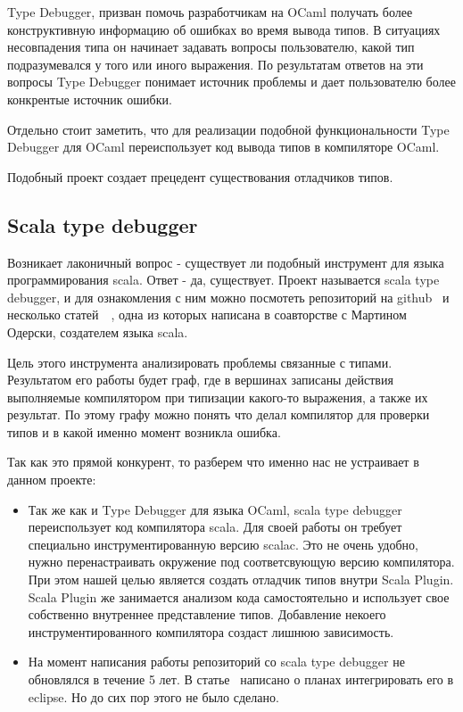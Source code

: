 Type Debugger, призван помочь разработчикам на OCaml получать более
конструктивную информацию об ошибках во время вывода типов.
В ситуациях несовпадения типа он начинает задавать
вопросы пользователю, какой тип подразумевался у того или иного выражения.
По результатам ответов на эти вопросы Type Debugger понимает источник проблемы
и дает пользователю более конкрентые источник ошибки.

Отдельно стоит заметить, что для реализации подобной функциональности
Type Debugger для OCaml переиспользует код вывода типов в компиляторе OCaml.

Подобный проект создает прецедент существования отладчиков типов.

\subsection{Scala type debugger}
\label{sec:typeDebugger}

Возникает лаконичный вопрос - существует ли подобный инструмент для языка
программирования scala.
Ответ - да, существует.
Проект называется scala type debugger, и для ознакомления с ним можно посмотеть
репозиторий на github~\cite{type_debugger_github} и несколько
статей~\cite{type_debugger1}~\cite{type_debugger2}, одна из которых
написана в соавторстве с Мартином Одерски, создателем языка scala.

Цель этого инструмента анализировать проблемы связанные с типами.
Результатом его работы будет граф, где в вершинах записаны действия выполняемые
компилятором при типизации какого-то выражения, а также их результат.
По этому графу можно понять что делал компилятор для проверки типов и
в какой именно момент возникла ошибка.

Так как это прямой конкурент, то разберем что именно нас не устраивает в данном
проекте:
\begin{itemize}
  \item Так же как и Type Debugger для языка OCaml, scala type debugger
  переиспользует код компилятора scala.
  Для своей работы он требует специально инструментированную версию scalac.
  Это не очень удобно, нужно перенастраивать окружение под соответсвующую версию
  компилятора.
  При этом нашей целью является создать отладчик типов внутри Scala Plugin.
  Scala Plugin же занимается анализом кода самостоятельно и использует
  свое собственно внутреннее представление типов.
  Добавление некоего инструментированного компилятора создаст лишнюю зависимость.
  \item На момент написания работы репозиторий со scala type debugger не
  обновлялся в течение 5 лет.
  В статье~\cite{type_debugger1} написано о планах интегрировать его в eclipse.
  Но до сих пор этого не было сделано.
\end{itemize}

